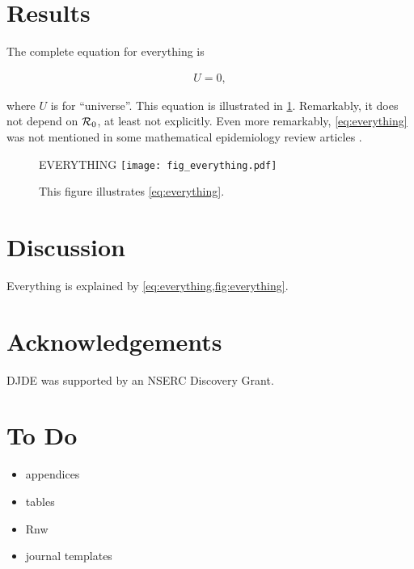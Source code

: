 \documentclass[12pt]{article}
\begin{document}
\section{Results}\label{sec:results}

The complete equation for everything is
\begin{linenomath*}
\begin{align}\label{eq:everything}
  U = 0,
\end{align}
\end{linenomath*}
where $U$ is for ``universe''.  This equation is illustrated
in \cref{fig:everything}.  Remarkably, it does not depend on ${\mathcal R}_0$,
at least not explicitly.  Even more remarkably, \cref{eq:everything}
was not mentioned in some mathematical epidemiology review articles
\cite{Earn+02,Earn04,Earn08,Earn09}.

\begin{figure}
  \begin{center}
    \Huge EVERYTHING
    \texttt{[image: fig\_everything.pdf]}
  \end{center}
  \caption{This figure illustrates \cref{eq:everything}.}
  \label{fig:everything}
\end{figure}

\section{Discussion}\label{sec:discussion}

Everything is explained by \cref{eq:everything,fig:everything}.

\section*{Acknowledgements}

DJDE was supported by an NSERC Discovery Grant.







\appendix

\section{To Do}\label{app:ToDo}

\begin{itemize}
\item appendices
\item tables
\item Rnw
\item journal templates
\end{itemize}
\end{document}
